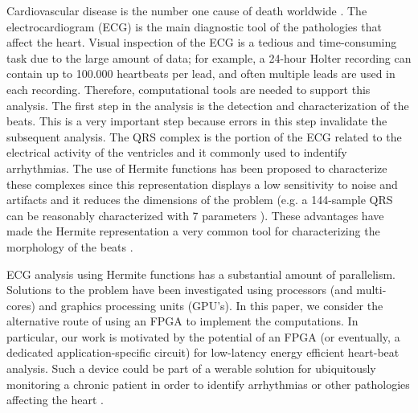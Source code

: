 \documentclass[conference]{IEEEtran}
\begin{document}




%
\IEEEpeerreviewmaketitle



Cardiovascular disease is the number one cause of death worldwide \cite{j:lagerholm00}. The
electrocardiogram (ECG) is the main diagnostic tool of the pathologies that affect the heart. Visual inspection of the ECG is a tedious and time-consuming task due to the large amount of data; for example, a 24-hour Holter recording can contain up to 100.000 heartbeats per lead, and often multiple leads are used in each recording. Therefore,
computational tools are needed to support this analysis. The first step in the analysis is the detection and characterization of the beats. This is a very important step because errors in this step invalidate the subsequent analysis. The QRS complex is the portion of the ECG related to the electrical activity of the ventricles and it commonly used to indentify arrhythmias\cite{j:lagerholm00, c:marquez13}. The use of Hermite functions has been proposed to characterize these complexes since %
this representation displays a low sensitivity to noise and artifacts and it reduces the dimensions of the problem (e.g. a 144-sample QRS can be reasonably characterized with 7 parameters \cite{c:marquez13}). 
These advantages have made the Hermite representation a very common tool for characterizing the 
morphology of the beats \cite{j:lagerholm00,c:marquez13,c:braccini97,j:linh03}. 

ECG analysis using Hermite functions has a
substantial amount of parallelism.  Solutions to the problem have been investigated
using processors (and multi-cores) and graphics processing units (GPU's). 
In this paper, we consider the alternative route of using an FPGA to implement
the computations.  In particular, our work is motivated by the potential
of an FPGA (or eventually, a dedicated application-specific circuit) for low-latency
energy efficient heart-beat analysis.  Such a device could be part of a werable solution 
for ubiquitously monitoring a chronic patient in order to identify arrhythmias or other pathologies affecting the heart \cite{c:philipp13,c:voykin13}.
\end{document}
